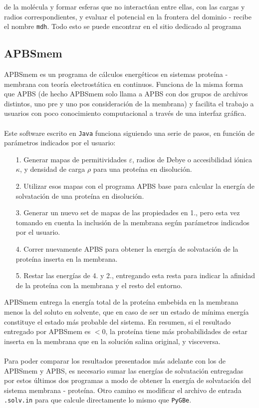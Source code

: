 \documentclass[12pt, oneside, numbers, spanish]{ezthesis}
\numberwithin{equation}{section}
\begin{document}
de la molécula y formar esferas que no interactúan entre ellas, con las cargas y radios correspondientes, y evaluar el potencial en la frontera del dominio - recibe el nombre \texttt{mdh}. Todo esto se puede encontrar en el sitio dedicado al programa \cite{pdb2pqr_1}

\subsection{APBSmem}\label{subsec:APBSmem}
APBSmem es un programa de cálculos energéticos en sistemas proteína - membrana con teoría electrostática en continuos. Funciona de la misma forma que APBS (de hecho APBSmem solo llama a APBS con dos grupos de archivos distintos, uno pre y uno pos consideración de la membrana) y facilita el trabajo a usuarios con poco conocimiento computacional a través de una interfaz gráfica.\\\\
Este software escrito en \texttt{Java} funciona siguiendo una serie de pasos, en función de parámetros indicados por el usuario:
\begin{itemize}
	\item[1.] Generar mapas de permitividades $\varepsilon$, radios de Debye o accesibilidad iónica $\kappa$, y densidad de carga $\rho$ para una proteína en disolución.
	\item[2.] Utilizar esos mapas con el programa APBS base para calcular la energía de solvatación de una proteína en disolución.
	\item[3.] Generar un nuevo set de mapas de las propiedades en 1., pero esta vez tomando en cuenta la inclusión de la membrana según parámetros indicados por el usuario.
	\item[4.] Correr nuevamente APBS para obtener la energía de solvatación de la proteína inserta en la membrana.
	\item[5.] Restar las energías de 4. y 2., entregando esta resta para indicar la afinidad de la proteína con la membrana y el resto del entorno.
\end{itemize}
APBSmem entrega la energía total de la proteína embebida en la membrana menos la del soluto en solvente, que en caso de ser un estado de mínima energía constituye el estado más probable del sistema. En resumen, si el resultado entregado por APBSmem es $<0$, la proteína tiene más probabilidades de estar inserta en la membrana que en la solución salina original, y visceversa.\\\\
Para poder comparar los resultados presentados más adelante con los de APBSmem y APBS, es necesario sumar las energías de solvatación entregadas por estos últimos dos programas a modo de obtener la energía de solvatación del sistema membrana - proteína. Otro camino es modificar el archivo de entrada \texttt{.solv.in} para que calcule directamente lo mismo que \texttt{PyGBe}.
\end{document}
